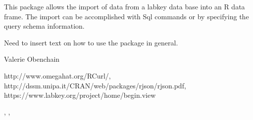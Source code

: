 \documentclass{article}
\begin{document}
\begin{Description}\relax
This package allows the import of data from a labkey data base
into an R data frame. The import can be accomplished with Sql
commands or by specifying the query schema information.
\end{Description}
\begin{Details}\relax
{}
Need to insert text on how to use the package in general.
\end{Details}
\begin{Author}\relax
Valerie Obenchain
\end{Author}
\begin{References}\relax
http://www.omegahat.org/RCurl/,
http://dssm.unipa.it/CRAN/web/packages/rjson/rjson.pdf,
https://www.labkey.org/project/home/begin.view
\end{References}
\begin{SeeAlso}\relax
{}, , 
\end{SeeAlso}
\end{document}
